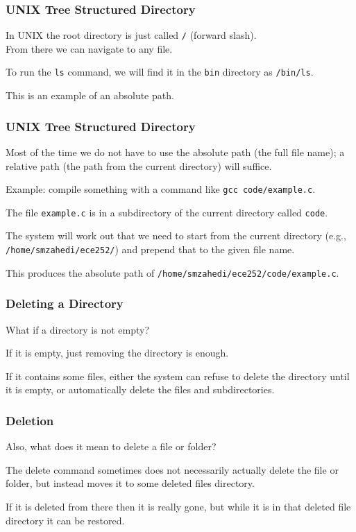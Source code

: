 \begin{frame}
	\frametitle{UNIX Tree Structured Directory}

	In UNIX the root directory is just called \texttt{/} (forward slash).\\
	\quad From there we can navigate to any file.

	To run the \texttt{ls} command, we will find it in the \texttt{bin} directory as \texttt{/bin/ls}.

	This is an example of an absolute path.

\end{frame}

\begin{frame}
	\frametitle{UNIX Tree Structured Directory}

	Most of the time we do not have to use the absolute path (the full file name); a relative path (the path from the current directory) will suffice.

	Example: compile something with a command like \texttt{gcc code/example.c}.

	The file \texttt{example.c} is in a subdirectory of the current directory called \texttt{code}.

	The system will work out that we need to start from the current directory (e.g., \texttt{/home/smzahedi/ece252/}) and prepend that to the given file name.

	This produces the absolute path of \texttt{/home/smzahedi/ece252/code/example.c}.

\end{frame}



\begin{frame}
	\frametitle{Deleting a Directory}

	What if a directory is not empty?

	If it is empty, just removing the directory is enough.

	If it contains some files, either the system can refuse to delete the directory until it is empty, or automatically delete the files and subdirectories.

\end{frame}

\begin{frame}
	\frametitle{Deletion}

	Also, what does it mean to delete a file or folder?

	The delete command sometimes does not necessarily actually delete the file or folder, but instead moves it to some deleted files directory.

	If it is deleted from there then it is really gone, but while it is in that deleted file directory it can be restored.

\end{frame}


